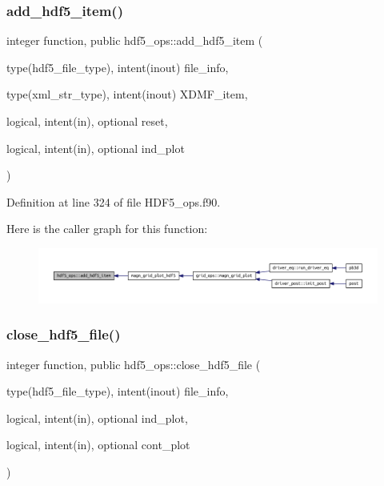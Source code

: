 \subsubsection{\texorpdfstring{add\+\_\+hdf5\+\_\+item()}{add\_hdf5\_item()}}
{\footnotesize\ttfamily integer function, public hdf5\+\_\+ops\+::add\+\_\+hdf5\+\_\+item (\begin{DoxyParamCaption}\item[{type(hdf5\+\_\+file\+\_\+type), intent(inout)}]{file\+\_\+info,  }\item[{type(xml\+\_\+str\+\_\+type), intent(inout)}]{X\+D\+M\+F\+\_\+item,  }\item[{logical, intent(in), optional}]{reset,  }\item[{logical, intent(in), optional}]{ind\+\_\+plot }\end{DoxyParamCaption})}



Definition at line 324 of file H\+D\+F5\+\_\+ops.\+f90.

Here is the caller graph for this function\+:
\nopagebreak
\begin{figure}[H]
\begin{center}
\leavevmode
\includegraphics[width=350pt]{namespacehdf5__ops_ade36dbd73b60da30e33a1059e590f734_icgraph}
\end{center}
\end{figure}
\mbox{\label{namespacehdf5__ops_ad6c53fff55bd71f63470ca1e525ddb56}} 
\subsubsection{\texorpdfstring{close\+\_\+hdf5\+\_\+file()}{close\_hdf5\_file()}}
{\footnotesize\ttfamily integer function, public hdf5\+\_\+ops\+::close\+\_\+hdf5\+\_\+file (\begin{DoxyParamCaption}\item[{type(hdf5\+\_\+file\+\_\+type), intent(inout)}]{file\+\_\+info,  }\item[{logical, intent(in), optional}]{ind\+\_\+plot,  }\item[{logical, intent(in), optional}]{cont\+\_\+plot }\end{DoxyParamCaption})}



